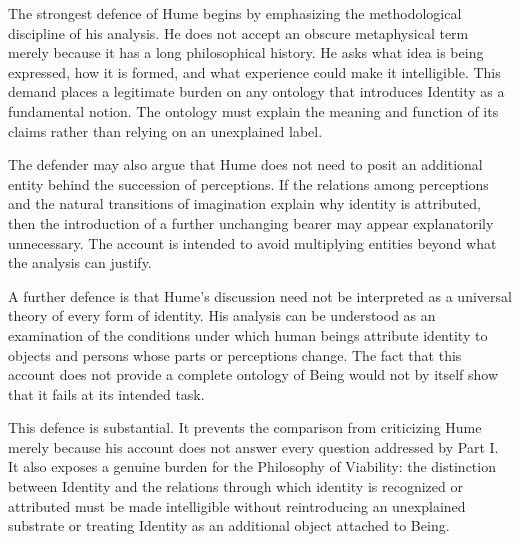 \label{para:VS.B01.P01.C08.S09.SS10.P001}

The strongest defence of Hume begins by emphasizing
the methodological discipline of his analysis.
He does not accept an obscure metaphysical term
merely because it has a long philosophical history.
He asks what idea is being expressed, how it is
formed, and what experience could make it intelligible.
This demand places a legitimate burden on any
ontology that introduces Identity as a fundamental
notion. The ontology must explain the meaning
and function of its claims rather than relying
on an unexplained label.

\label{para:VS.B01.P01.C08.S09.SS10.P002}

The defender may also argue that Hume does not
need to posit an additional entity behind the
succession of perceptions. If the relations among
perceptions and the natural transitions of
imagination explain why identity is attributed,
then the introduction of a further unchanging
bearer may appear explanatorily unnecessary.
The account is intended to avoid multiplying
entities beyond what the analysis can justify.

\label{para:VS.B01.P01.C08.S09.SS10.P003}

A further defence is that Hume's discussion need
not be interpreted as a universal theory of every
form of identity. His analysis can be understood
as an examination of the conditions under which
human beings attribute identity to objects and
persons whose parts or perceptions change.
The fact that this account does not provide a
complete ontology of Being would not by itself
show that it fails at its intended task.

\label{para:VS.B01.P01.C08.S09.SS10.P004}

This defence is substantial. It prevents the
comparison from criticizing Hume merely because
his account does not answer every question
addressed by Part I. It also exposes a genuine
burden for the Philosophy of Viability: the
distinction between Identity and the relations
through which identity is recognized or attributed
must be made intelligible without reintroducing
an unexplained substrate or treating Identity
as an additional object attached to Being.



